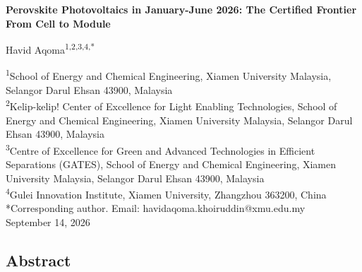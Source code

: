 \documentclass[
  11pt,
]{article}
\author{}
\date{}
\begin{document}
\begin{center}
{\LARGE\bfseries Perovskite Photovoltaics in January-June 2026: The Certified Frontier From Cell to Module\par}
\vspace{1.1em}
{\large Havid Aqoma\textsuperscript{1,2,3,4,*}\par}
\vspace{0.7em}
\begin{minipage}{\textwidth}\centering\small
\textsuperscript{1}School of Energy and Chemical Engineering, Xiamen University Malaysia, Selangor Darul Ehsan 43900, Malaysia\\[0.25em]
\textsuperscript{2}Kelip-kelip! Center of Excellence for Light Enabling Technologies, School of Energy and Chemical Engineering, Xiamen University Malaysia, Selangor Darul Ehsan 43900, Malaysia\\[0.25em]
\textsuperscript{3}Centre of Excellence for Green and Advanced Technologies in Efficient Separations (GATES), School of Energy and Chemical Engineering, Xiamen University Malaysia, Selangor Darul Ehsan 43900, Malaysia\\[0.25em]
\textsuperscript{4}Gulei Innovation Institute, Xiamen University, Zhangzhou 363200, China\\[0.55em]
*Corresponding author. Email: havidaqoma.khoiruddin@xmu.edu.my\\[2.0em]
September 14, 2026
\end{minipage}
\end{center}
\vspace{0.8em}

\subsection{Abstract}\label{abstract}
\end{document}
